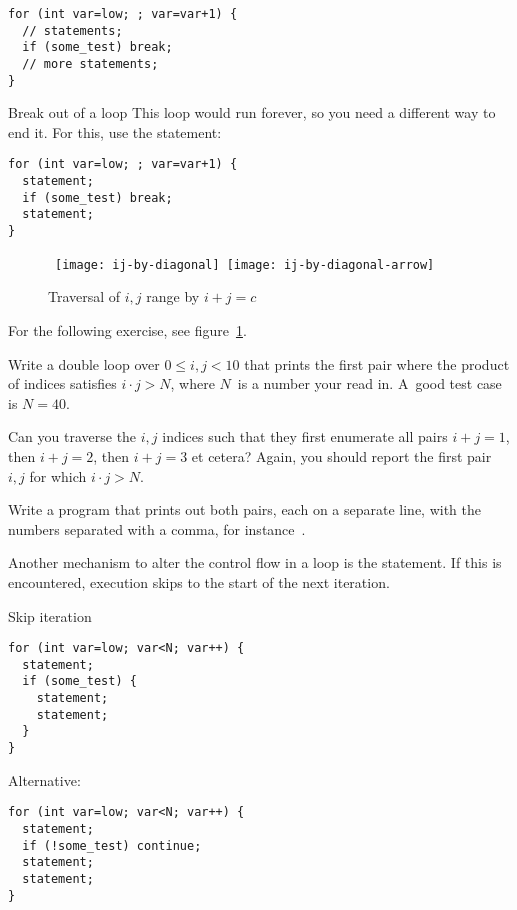 \begin{verbatim}
for (int var=low; ; var=var+1) {
  // statements;
  if (some_test) break;
  // more statements;
}
\end{verbatim}

\begin{slide}{Break out of a loop}
  \label{sl:for-break}
  This loop would run forever, so you need a different way to end
  it. For this, use the  statement:
\begin{verbatim}
for (int var=low; ; var=var+1) {
  statement;
  if (some_test) break;
  statement;
}
\end{verbatim}
\end{slide}

\ifIncludeAnswers
\vfill\eject
\fi

\begin{figure}[ht]
  \hbox\bgroup
  \texttt{[image: ij-by-diagonal]}
  \texttt{[image: ij-by-diagonal-arrow]}
  \egroup
  \caption{Traversal of $i,j$ range by $i+j=c$}
  \label{fig:ij-diag}
\end{figure}

For the following exercise, see figure~\ref{fig:ij-diag}.

\begin{exercise}
  \label{ex:ij-product}
  Write a double loop over $0\leq i,j<10$ that prints the first pair
  where the product of indices satisfies $i\cdot j> N$, where $N$~is a
  number your read in. A~good test case is $N=40$.

  Can you traverse the $i,j$ indices such that they first enumerate
  all pairs $i+j=1$, then $i+j=2$, then $i+j=3$ et cetera? Again, you
  should report the first pair $i,j$ for which $i\cdot j>N$.

  Write a program that prints out both pairs, each on a separate line,
  with the numbers separated with a comma, for instance~.
\end{exercise}

Another mechanism to alter the control flow in a loop is the
 statement. If this is encountered, execution
skips to the start of the next iteration.

\begin{block}{Skip iteration}
  \label{sl:for-cont}
\begin{verbatim}
for (int var=low; var<N; var++) {
  statement;
  if (some_test) {
    statement;
    statement;
  }
}
\end{verbatim}
Alternative:
\begin{verbatim}
for (int var=low; var<N; var++) {
  statement;
  if (!some_test) continue;
  statement;
  statement;
}
\end{verbatim}
\end{block}

